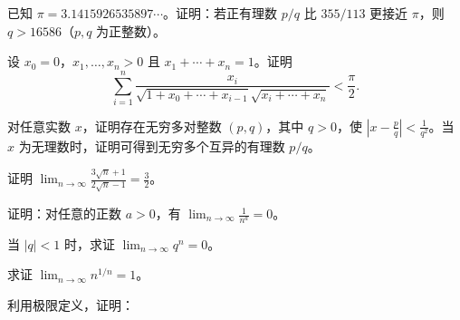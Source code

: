 \noindent\begin{minipage}{\textwidth}
已知 $\pi=3.1415926535897\cdots$。证明：若正有理数 $p/q$ 比 $355/113$ 更接近 $\pi$，则 $q>16586$（$p,q$ 为正整数）。
\end{minipage}\par\vfill
\newpage
\noindent\begin{minipage}{\textwidth}
设 $x_0=0$，$x_1,\ldots,x_n>0$ 且 $x_1+\cdots+x_n=1$。证明\[\sum_{i=1}^n\frac{x_i}{\sqrt{1+x_0+\cdots+x_{i-1}}\sqrt{x_i+\cdots+x_n}}<\frac\pi2.\]
\end{minipage}\par\vfill
\noindent\begin{minipage}{\textwidth}
对任意实数 $x$，证明存在无穷多对整数 $(p,q)$，其中 $q>0$，使 $\left|x-\frac pq\right|<\frac1{q^2}$。当 $x$ 为无理数时，证明可得到无穷多个互异的有理数 $p/q$。
\end{minipage}\par\vfill
\noindent\begin{minipage}{\textwidth}
证明 $\displaystyle\lim_{n\to\infty}\frac{3\sqrt n+1}{2\sqrt n-1}=\frac32$。
\end{minipage}\par\vfill
\newpage
\noindent\begin{minipage}{\textwidth}
证明：对任意的正数 $a>0$，有 $\displaystyle\lim_{n\to\infty}\frac1{n^a}=0$。
\end{minipage}\par\vfill
\noindent\begin{minipage}{\textwidth}
当 $|q|<1$ 时，求证 $\displaystyle\lim_{n\to\infty}q^n=0$。
\end{minipage}\par\vfill
\noindent\begin{minipage}{\textwidth}
求证 $\displaystyle\lim_{n\to\infty}n^{1/n}=1$。
\end{minipage}\par\vfill
\newpage
\noindent\begin{minipage}{\textwidth}
利用极限定义，证明：
\end{minipage}\par\vfill
